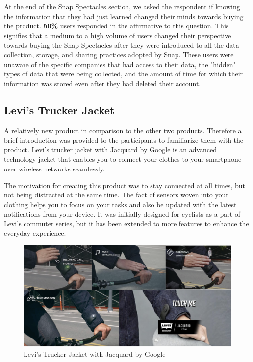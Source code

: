 \documentclass[sigconf]{acmart}
\begin{document}
At the end of the Snap Spectacles section, we asked the respondent if knowing the information that they had just learned changed their minds towards buying the product. \textbf{50\%} users responded in the affirmative to this question. This signifies that a medium to a high volume of users changed their perspective towards buying the Snap Spectacles after they were introduced to all the data collection, storage, and sharing practices adopted by Snap. These users were unaware of the specific companies that had access to their data, the "hidden" types of data that were being collected, and the amount of time for which their information was stored even after they had deleted their account.  

\subsection{Levi's Trucker Jacket} \label{levisAnalysis}

A relatively new product in comparison to the other two products. Therefore a brief introduction was provided to the participants to familiarize them with the product. Levi's trucker jacket with Jacquard by Google is an advanced technology jacket that enables you to connect your clothes to your smartphone over wireless networks seamlessly. 

The motivation for creating this product was to stay connected at all times, but not being distracted at the same time. The fact of sensors woven into your clothing helps you to focus on your tasks and also be updated with the latest notifications from your device. It was initially designed for cyclists as a part of Levi's commuter series, but it has been extended to more features to enhance the everyday experience.

\begin{figure}[h]
  \centering
  \includegraphics[width=\linewidth]{jacket.png}
  \caption{Levi's Trucker Jacket with Jacquard by Google}
  \label{fig:jacketOne}
  \Description{}
\end{figure}
\end{document}
